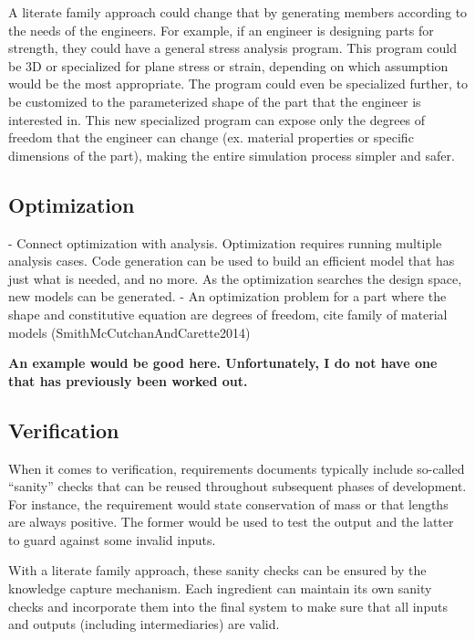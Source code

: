 \documentclass[10pt, preprint]{sigplanconf}
\begin{document}
A literate family approach could change that by generating members according
to the needs of the engineers. For example, if an engineer is designing parts 
for strength, they could have a general stress analysis program. This program 
could be 3D or specialized for plane stress or strain, depending on which 
assumption would be the most appropriate. The program could even be specialized
further, to be customized to the parameterized shape of the part that the
engineer is interested in. This new specialized program can expose only the 
degrees of freedom that the engineer can change (ex. material properties or
specific dimensions of the part), making the entire simulation process simpler
and safer.


\subsection{Optimization} \label{subsec:optimization}

- Connect optimization with analysis.  Optimization requires running multiple
analysis cases.  Code generation can be used to build an efficient model that
has just what is needed, and no more.  As the optimization searches the design
space, new models can be generated.  - An optimization problem for a part where
the shape and constitutive equation are degrees of freedom, cite family of
material models (SmithMcCutchanAndCarette2014)

\textbf{An example would be good here.  Unfortunately, I do not have one that
  has previously been worked out.}

\subsection{Verification} \label{subsec:verification}

When it comes to verification, requirements documents typically include
so-called ``sanity'' checks that can be reused throughout subsequent phases
of development. For instance, the requirement would state conservation of mass
or that lengths are always positive. The former would be used to test the output
and the latter to guard against some invalid inputs.

With a literate family approach, these sanity checks can be ensured by the 
knowledge capture mechanism. Each ingredient can maintain its own sanity
checks and incorporate them into the final system to make sure that all inputs
and outputs (including intermediaries) are valid.
\end{document}
